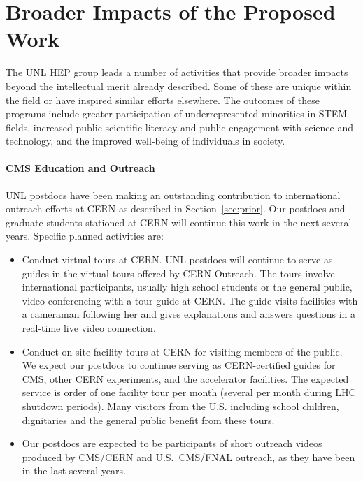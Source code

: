 \section{Broader Impacts of the Proposed Work}

The UNL HEP group leads a number of activities that provide broader impacts beyond the intellectual merit already described. Some of these are unique within the field or have inspired similar efforts elsewhere. The outcomes of these programs include  greater participation of underrepresented minorities in STEM fields, increased public scientific literacy and public engagement with science and technology, and the improved well-being of individuals in society.

\paragraph{CMS Education and Outreach}
UNL postdocs have been making an outstanding contribution to international outreach
efforts at CERN as described in Section~\ref{sec:prior}.
Our postdocs and graduate students stationed at CERN will continue this work in the
next several years. Specific planned activities are:
\begin{itemize}

     \item Conduct virtual tours at CERN.  UNL
   	postdocs will continue to serve as guides in the virtual tours offered by CERN
       Outreach. The tours involve international participants, usually high school
       students or the general public, video-conferencing with a tour guide at CERN.
       The guide visits facilities with a cameraman following her and gives
       explanations and answers questions in a real-time live video connection.

     \item Conduct on-site facility tours at CERN for visiting members of the public. We
       expect our postdocs to continue serving as CERN-certified guides for CMS,
       other CERN experiments, and the accelerator facilities. The expected
       service is order of one facility tour per month (several per month during
       LHC shutdown periods). Many visitors from the U.S. including school
       children, dignitaries and the general public benefit from these tours.

   \item Our postdocs are expected to be participants of short outreach videos
       produced by CMS/CERN and U.S.~CMS/FNAL outreach, as they have been in the last
       several years.
\end{itemize}

